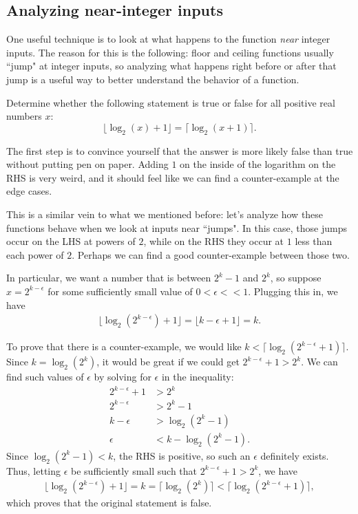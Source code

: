 \documentclass{article}
\begin{document}
\subsection{Analyzing near-integer inputs}

One useful technique is to look at what happens to the function \emph{near} integer inputs. The reason for this is the following: floor and ceiling functions usually ``jump" at integer inputs, so analyzing what happens right before or after that jump is a useful way to better understand the behavior of a function.

\begin{exam}
Determine whether the following statement is true or false for all positive real numbers $x$:
\[ \lfloor \log_2 (x) + 1 \rfloor = \lceil \log_2 (x + 1) \rceil. \]
\end{exam}

\begin{sol}
The first step is to convince yourself that the answer is more likely false than true without putting pen on paper. Adding $1$ on the inside of the logarithm on the RHS is very weird, and it should feel like we can find a counter-example at the edge cases.

This is a similar vein to what we mentioned before: let's analyze how these functions behave when we look at inputs near ``jumps". In this case, those jumps occur on the LHS at powers of $2$, while on the RHS they occur at $1$ less than each power of $2$. Perhaps we can find a good counter-example between those two.

In particular, we want a number that is between $2^k - 1$ and $2^k$, so suppose $x = 2^{k - \epsilon}$ for some sufficiently small value of $0  < \epsilon << 1$.  Plugging this in, we have
\begin{align*}
\lfloor \log_2 (2^{k - \epsilon}) + 1 \rfloor = \lfloor k - \epsilon + 1 \rfloor = k.
\end{align*}

To prove that there is a counter-example, we would like $k < \lceil \log_2 (2^{k - \epsilon} + 1) \rceil$. Since $k = \log_2 (2^k)$, it would be great if we could get $2^{k - \epsilon} + 1 > 2^k$. We can find such values of $\epsilon$ by solving for $\epsilon$ in the inequality:
\begin{align*}
2^{k - \epsilon} + 1 &> 2^k \\
2^{k - \epsilon} &> 2^k - 1 \\
k - \epsilon &> \log_2 (2^k - 1) \\
\epsilon &< k - \log_2 (2^k - 1).
\end{align*}
Since $\log_2 (2^k - 1) < k$, the RHS is positive, so such an $\epsilon$ definitely exists.  Thus, letting $\epsilon$ be sufficiently small such that $2^{k - \epsilon} + 1 > 2^k$, we have
\begin{align*}
\lfloor \log_2 (2^{k - \epsilon}) + 1 \rfloor = k = \lceil \log_2 (2^k) \rceil   <  \lceil \log_2 (2^{k - \epsilon} + 1) \rceil,
\end{align*}
which proves that the original statement is false.
\end{sol}
\end{document}
